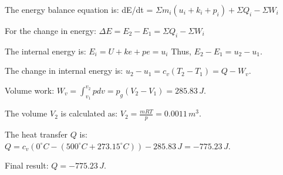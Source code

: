 The energy balance equation is:  
dE/dt = \( \Sigma m_i (u_i + k_i + p_i) + \Sigma Q_i - \Sigma W_i \)  

For the change in energy:  
\( \Delta E = E_2 - E_1 = \Sigma Q_i - \Sigma W_i \)  

The internal energy is:  
\( E_i = U + ke + pe = u_i \)  
Thus, \( E_2 - E_1 = u_2 - u_1 \).  

The change in internal energy is:  
\( u_2 - u_1 = c_v (T_2 - T_1) = Q - W_v \).  

Volume work:  
\( W_v = \int_{v_1}^{v_2} p dv = p_{g} (V_2 - V_1) = 285.83 \, J \).  

The volume \( V_2 \) is calculated as:  
\( V_2 = \frac{m R T}{p} = 0.0011 \, m^3 \).  

The heat transfer \( Q \) is:  
\( Q = c_v (0^\circ C - (500^\circ C + 273.15^\circ C)) - 285.83 \, J = -775.23 \, J \).  

Final result:  
\( Q = -775.23 \, J \).